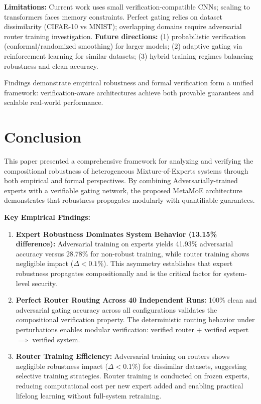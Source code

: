\documentclass[11pt,a4paper]{article}
\begin{document}
\textbf{Limitations:} Current work uses small verification-compatible CNNs; scaling to transformers faces memory constraints. Perfect gating relies on dataset dissimilarity (CIFAR-10 vs MNIST); overlapping domains require adversarial router training investigation. \textbf{Future directions:} (1) probabilistic verification (conformal/randomized smoothing) for larger models; (2) adaptive gating via reinforcement learning for similar datasets; (3) hybrid training regimes balancing robustness and clean accuracy.

Findings demonstrate empirical robustness and formal verification form a unified framework: verification-aware architectures achieve both provable guarantees and scalable real-world performance.

\section{Conclusion}

This paper presented a comprehensive framework for analyzing and verifying the compositional robustness of heterogeneous Mixture-of-Experts systems through both empirical and formal perspectives. By combining Adversarially-trained experts with a verifiable gating network, the proposed MetaMoE architecture demonstrates that robustness propagates modularly with quantifiable guarantees.

\textbf{Key Empirical Findings:}
\begin{enumerate}
    \item \textbf{Expert Robustness Dominates System Behavior (13.15\% difference):} Adversarial training on experts yields 41.93\% adversarial accuracy versus 28.78\% for non-robust training, while router training shows negligible impact ($\Delta < 0.1\%$). This asymmetry establishes that expert robustness propagates compositionally and is the critical factor for system-level security.

    \item \textbf{Perfect Router Routing Across 40 Independent Runs:} 100\% clean and adversarial gating accuracy across all configurations validates the compositional verification property. The deterministic routing behavior under perturbations enables modular verification: verified router + verified expert $\implies$ verified system.

    \item \textbf{Router Training Efficiency:} Adversarial training on routers shows negligible robustness impact ($\Delta < 0.1\%$) for dissimilar datasets, suggesting selective training strategies. Router training is conducted on frozen experts, reducing computational cost per new expert added and enabling practical lifelong learning without full-system retraining.
\end{enumerate}
\end{document}
